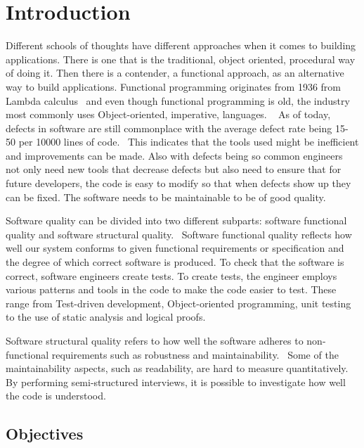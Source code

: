 \chapter{Introduction}\label{introduction}

Different schools of thoughts have different approaches when it comes to
building applications. There is one that is the traditional, object oriented,
procedural way of doing it. Then there is a contender, a functional approach, as
an alternative way to build applications. Functional programming originates from
1936 from Lambda calculus~\cite{Turner} and even though functional programming
is old, the industry most commonly uses Object-oriented, imperative, languages.
~\cite{tiobe2013tiobe} As of today, defects in software are still
commonplace with the average defect rate being 15- 50 per 10000 lines of
code.~\cite{McConnell:2004:CCS:1096143} This indicates that the tools used might
be inefficient and improvements can be made. Also with defects being so common
engineers not only need new tools that decrease defects but also need to ensure
that for future developers, the code is easy to modify so that when defects show
up they can be fixed. The software needs to be maintainable to be of good
quality.

Software quality can be divided into two different subparts: software functional
quality and software structural quality.~\cite{Pressman:2004:SEP:994110}
Software functional quality reflects how well our system conforms to given
functional requirements or specification and the degree of which correct
software is produced.  To check that the software is correct, software engineers
create tests. To create tests, the engineer employs various patterns
and tools in the code to make the code easier to test. These range from
Test-driven development, Object-oriented programming, unit
testing~\cite{beck2003test} to the use of static analysis and logical
proofs. 

Software structural quality refers to how well the software adheres to
non-functional requirements such as robustness and
maintainability.~\cite{Pressman:2004:SEP:994110} Some of the maintainability
aspects, such as readability, are hard to measure quantitatively. By performing
semi-structured interviews, it is possible to investigate how well the code is
understood. 

\section{Objectives}

